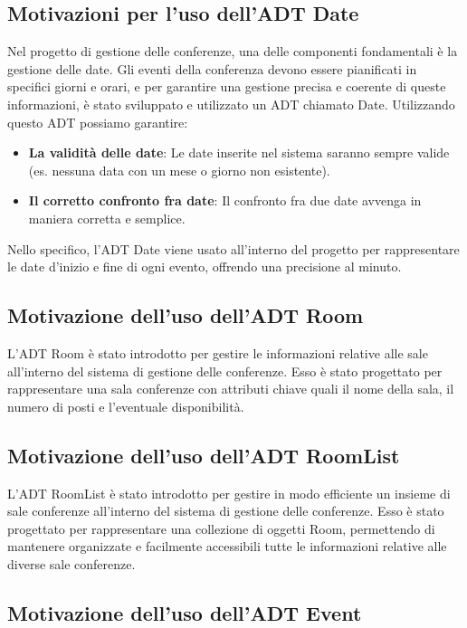 \documentclass[11pt]{scrartcl} %
\begin{document}
\subsection{Motivazioni per l'uso dell'ADT Date}


Nel progetto di gestione delle conferenze, una delle componenti fondamentali è la gestione delle date. Gli eventi della conferenza devono essere pianificati in specifici giorni e orari, e per garantire una gestione precisa e coerente di queste informazioni, è stato sviluppato e utilizzato un ADT chiamato Date. Utilizzando questo ADT possiamo garantire:
\begin{itemize}
				\item  \textbf{La validità delle date}:  Le date inserite nel sistema saranno sempre valide (es. nessuna data con un mese o giorno non esistente).
				\item \textbf{Il corretto confronto fra date}: Il confronto fra due date avvenga in maniera corretta e semplice.
\end{itemize}
Nello specifico, l'ADT Date viene usato all'interno del progetto per rappresentare le date d'inizio e fine di ogni evento, offrendo una precisione al minuto.

\subsection{Motivazione dell'uso dell'ADT Room}


L'ADT Room è stato introdotto per gestire le informazioni relative alle sale all'interno del sistema di gestione delle conferenze. Esso è stato progettato per rappresentare una sala conferenze con attributi chiave quali il nome della sala, il numero di posti e l'eventuale disponibilità.



\subsection{Motivazione dell'uso dell'ADT RoomList}

L'ADT RoomList è stato introdotto per gestire in modo efficiente un insieme di sale conferenze all'interno del sistema di gestione delle conferenze. Esso è stato progettato per rappresentare una collezione di oggetti Room, permettendo di mantenere organizzate e facilmente accessibili tutte le informazioni relative alle diverse sale conferenze.

\subsection{Motivazione dell'uso dell'ADT Event}
\end{document}
